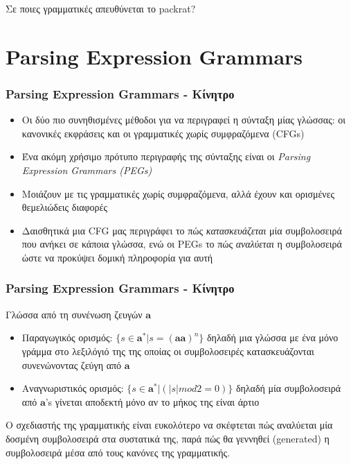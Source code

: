 \documentclass{beamer}
\begin{document}
\begin{frame}
  Σε ποιες γραμματικές απευθύνεται το packrat?
\end{frame}

\section{Parsing Expression Grammars}

\begin{frame}
  \frametitle{Parsing Expression Grammars - Κίνητρο}

  \begin{itemize}
	\item Οι δύο πιο συνηθισμένες μέθοδοι για να περιγραφεί η σύνταξη μίας γλώσσας: οι κανονικές εκφράσεις και οι γραμματικές χωρίς συμφραζόμενα (CFGs) \pause
	\item Ένα ακόμη χρήσιμο πρότυπο περιγραφής της σύνταξης είναι οι \textit{Parsing Expression Grammars (PEGs)} 
	\item Μοιάζουν με τις γραμματικές χωρίς συμφραζόμενα, αλλά έχουν και ορισμένες θεμελιώδεις διαφορές  \pause
	\item Δαισθητικά μια CFG μας περιγράφει το πώς  \textit{κατασκευάζεται} μία συμβολοσειρά που ανήκει σε κάποια γλώσσα, ενώ οι  PEGs  το πώς  \textit{αναλύεται} η συμβολοσειρά ώστε να προκύψει δομική πληροφορία για αυτή
  \end{itemize}

\end{frame}
\begin{frame}
  \frametitle{Parsing Expression Grammars - Κίνητρο}
  \begin{example}
Γλώσσα από τη συνένωση ζευγών $\mathbf{a}$
	\begin{itemize}
	  \item Παραγωγικός ορισμός: $\{ s \in \mathbf{a}^* | s = {(\mathbf{a}\mathbf{a})}^n\}$ δηλαδή μια γλώσσα με ένα μόνο γράμμα στο λεξιλόγιό της της οποίας οι συμβολοσειρές 
 κατασκευάζονται συνενώνοντας ζεύγη από $ \mathbf{a}$
      \item Αναγνωριστικός ορισμός: $\{ s \in \mathbf{a}^* | (\lvert s \rvert mod2=0)\}$ δηλαδή μία συμβολοσειρά από $\mathbf{a}$'s γίνεται αποδεκτή μόνο αν το μήκος της είναι άρτιο
	\end{itemize}
  \end{example}
\pause
Ο σχεδιαστής της γραμματικής είναι ευκολότερο να σκέφτεται πώς αναλύεται μία δοσμένη συμβολοσειρά στα συστατικά της, παρά πώς θα γεννηθεί (generated) η συμβολοσειρά μέσα από τους κανόνες της γραμματικής.
\end{frame}
\end{document}
